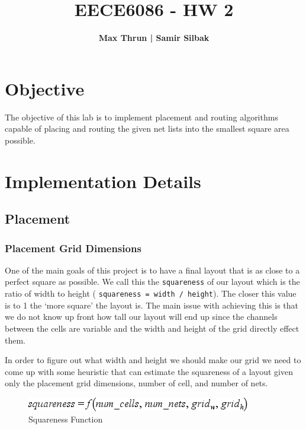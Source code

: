 \documentclass[10pt]{article}
\title{
    \vspace{2in}
    \textmd{\textbf{EECE6086 - HW 2}}\\
    \vspace{4in}
}
\author{\textbf{Max Thrun | Samir Silbak}}
\begin{document}
\maketitle
\newpage
\section{Objective}

The objective of this lab is to implement placement and routing algorithms
capable of placing and routing the given net lists into the smallest square
area possible.

\section{Implementation Details}

\subsection{Placement}

    \subsubsection{Placement Grid Dimensions}

        One of the main goals of this project is to have a final layout that is
        as close to a perfect square as possible. We call this the
        \texttt{squareness} of our layout which is the ratio of width to height (
        \texttt{squareness = width / height}).  The closer this value is to 1
        the `more square' the layout is.  The main issue with achieving this is
        that we do not know up front how tall our layout will end up since the
        channels between the cells are variable and the width and height of the grid
        directly effect them.

        In order to figure out what width and height we should make our grid we need
        to come up with some heuristic that can estimate the squareness of a layout
        given only the placement grid dimensions, number of cell, and number of nets.

        \begin{figure}[H]
            \centering
            \includegraphics{./square_f.png}
            \caption{Squareness Function}
        \end{figure}
\end{document}
